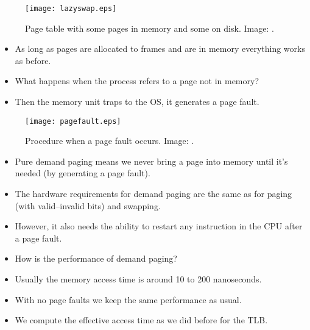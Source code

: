\documentclass{beamer}
\begin{document}
\begin{frame}{\insertsubsectionhead}
  \begin{figure}
    \texttt{[image: lazyswap.eps]}
    \caption{Page table with some pages in memory and some on disk.
      Image: \cite{Silberschatz2013osc}.}
  \end{figure}
\end{frame}

\begin{frame}{\insertsubsectionhead}
  \begin{itemize}
    \item As long as pages are allocated to frames and are in memory everything 
      works as before.

    \item What happens when the process refers to a page not in memory?

    \item Then the memory unit traps to the OS, it generates a page fault.

  \end{itemize}
\end{frame}

\begin{frame}{\insertsubsectionhead}
  \begin{figure}
    \texttt{[image: pagefault.eps]}
    \caption{Procedure when a page fault occurs.
      Image: \cite{Silberschatz2013osc}.}
  \end{figure}
\end{frame}

\begin{frame}{\insertsubsectionhead}
  \begin{itemize}
    \item Pure demand paging means we never bring a page into memory until it's 
      needed (by generating a page fault).

    \item The hardware requirements for demand paging are the same as for 
      paging (with valid--invalid bits) and swapping.

    \item However, it also needs the ability to restart any instruction in the 
      CPU after a page fault.
  \end{itemize}
\end{frame}

\begin{frame}{\insertsubsectionhead}
  \begin{itemize}
    \item How is the performance of demand paging?

    \item Usually the memory access time is around 10 to 200 nanoseconds.

    \item With no page faults we keep the same performance as usual.

    \item We compute the effective access time as we did before for the TLB.

  \end{itemize}
\end{frame}
\end{document}
